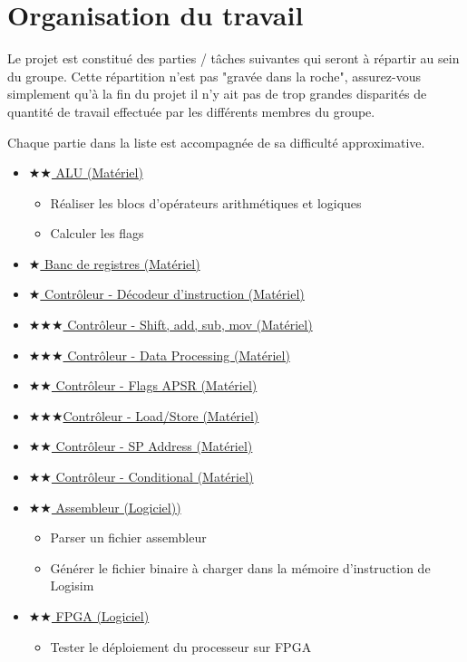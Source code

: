 \documentclass{article}
\begin{document}
    \section{Organisation du travail}

    Le projet est constitué des parties / tâches suivantes qui seront à répartir au sein du groupe.
    Cette répartition n'est pas "gravée dans la roche", assurez-vous simplement qu'à la fin du projet il n'y ait pas de trop grandes disparités de quantité de travail effectuée par les différents membres du groupe.

    Chaque partie dans la liste est accompagnée de sa difficulté approximative.

    \begin{itemize}
        \item \hyperref[sec:ALU]{$\bigstar\bigstar$ ALU (Matériel)}
        \begin{itemize}
            \item Réaliser les blocs d'opérateurs arithmétiques et logiques
            \item Calculer les flags
        \end{itemize}
        \item \hyperref[sec:BDR]{$\bigstar$ Banc de registres (Matériel)}
        \item \hyperref[sec:OpDec]{$\bigstar$ Contrôleur - Décodeur d'instruction (Matériel)}
        \item \hyperref[sec:SASM]{$\bigstar\bigstar\bigstar$ Contrôleur - Shift, add, sub, mov (Matériel)}
        \item \hyperref[sec:DataProc]{$\bigstar\bigstar\bigstar$ Contrôleur - Data Processing (Matériel)}
        \item \hyperref[sec:FlagsAPSR]{$\bigstar\bigstar$ Contrôleur - Flags APSR (Matériel)}
        \item \hyperref[sec:LoadStore]{$\bigstar\bigstar\bigstar$Contrôleur - Load/Store (Matériel)}
        \item \hyperref[sec:SPAddr]{$\bigstar\bigstar$ Contrôleur - SP Address (Matériel)}
        \item \hyperref[sec:Conditional]{$\bigstar\bigstar$ Contrôleur - Conditional (Matériel)}
        \item \hyperref[sec:ASM]{$\bigstar\bigstar$ Assembleur (Logiciel))}
        \begin{itemize}
            \item Parser un fichier assembleur
            \item Générer le fichier binaire à charger dans la mémoire d'instruction de Logisim
        \end{itemize}
        \item \hyperref[sec:FPGA]{$\bigstar\bigstar$ FPGA (Logiciel)}
        \begin{itemize}
            \item Tester le déploiement du processeur sur FPGA
        \end{itemize}
    \end{itemize}
\end{document}
